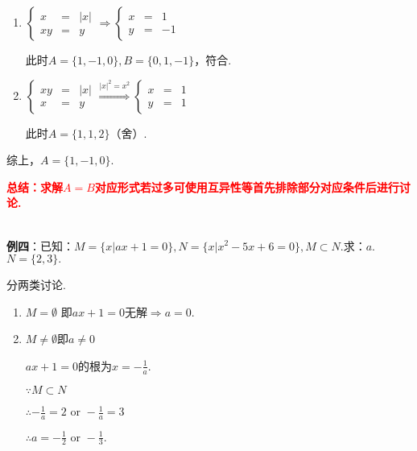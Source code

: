 \documentclass[8pt]{article}
\begin{document}
				\begin{enumerate}[label=$\arabic*^{\circ}$]

					\item $\displaystyle \left\{\begin{array}{rcl}x&=&|x|\\xy&=&y\end{array}\right. \Rightarrow \left\{\begin{array}{rcl}x&=&1\\y&=&-1\end{array}\right.$

						此时$A=\{1, -1, 0\}, B=\{0, 1, -1\}$，符合.

					\item $\displaystyle \left\{\begin{array}{rcl}xy&=&|x|\\x&=&y\end{array}\right. \overset{|x|^2=x^2}{\Longrightarrow} \left\{\begin{array}{rcl}x&=&1\\y&=&1\end{array}\right.$

						此时$A=\{1, 1, 2\}$（舍）.

				\end{enumerate}

				综上，$A=\{1, -1, 0\}.$

				\textcolor{red}{\textbf{总结：求解$A=B$对应形式若过多可使用互异性等首先排除部分对应条件后进行讨论.}}

				~\\

				\textbf{例四}：已知：$M=\{x|ax+1=0\}, N=\{x|x^2-5x+6=0\}, M\subset N$.求：$a$.
				~\\

				$N=\{2,3\}.$

				分两类讨论.

				\begin{enumerate}[label=$\arabic*^{\circ}$]

					\item $M=\emptyset$
						即$ax+1=0$无解$\Rightarrow a=0.$

					\item $M\neq \emptyset$即$a\neq 0$

						$ax+1=0$的根为$x=-\frac{1}{a}.$

						$\because M\subset N$

						$\therefore -\frac{1}{a}=2 \text{ or } -\frac{1}{a}=3$

						$\therefore a=-\frac{1}{2} \text{ or } -\frac{1}{3}.$

				\end{enumerate}
\end{document}
